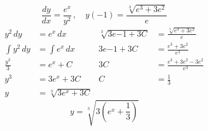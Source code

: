 \documentclass[12pt]{article}
\begin{document}
\begin{multicols}{2}
\begin{center}
    $$\frac{dy}{dx} = \frac{e^x}{y^2}\,, \quad y(-1) = \frac{\sqrt[3]{e^3 + 3e^2}}{e}$$
    \vspace*{-24pt}
    \begin{align*}
        y^2\,dy &= e^x\,dx & \sqrt[3]{3e{-1} + 3C} &= \frac{\sqrt[3]{e^3 + 3e^2}}{e} \\
        \int y^2\,dy &= \int e^x\,dx & 3e{-1} + 3C &= \frac{e^3 + 3e^2}{e^3}\\
        \frac{y^3}{3} &= e^x + C & 3C &= \frac{e^3 + 3e^2 - 3e^2}{e^3} \\
        y^3 &= 3e^x + 3C & C &= \frac{1}{3}\\
        y &= \sqrt[3]{3e^x + 3C} 
    \end{align*}
    $$y = \sqrt[3]{3(e^x + \frac{1}{3})}$$ 
    \end{center}
    \vspace{64pt}
\end{multicols}
\end{document}
